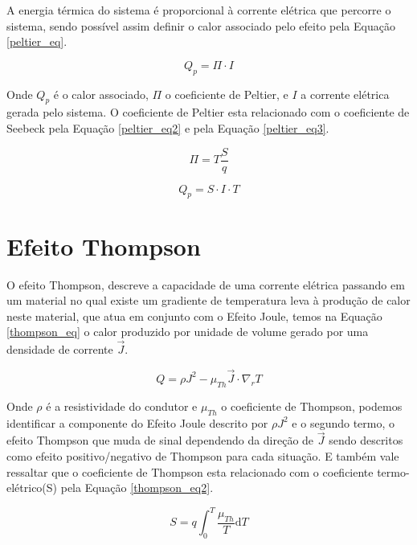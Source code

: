 \documentclass[a4paper,12pt]{report}
\begin{document}
	\noindent A energia térmica do sistema é proporcional à corrente elétrica que percorre o sistema, sendo possível assim definir o calor associado pelo efeito pela Equação \ref{peltier_eq}.
	
	\begin{equation}
	Q_{p} = \Pi \cdot I
	\label{peltier_eq}
	\end{equation}
	
	\noindent Onde $Q_{p}$ é o calor associado, $\Pi$ o coeficiente de Peltier, e $I$ a corrente elétrica gerada pelo sistema. O coeficiente de Peltier esta relacionado com o coeficiente de Seebeck pela Equação \ref{peltier_eq2} e pela Equação \ref{peltier_eq3}.
	
	\begin{equation}
	\Pi = T \frac{S}{q}
	\label{peltier_eq2}
	\end{equation}
	
	\begin{equation}
	Q_{p} = S \cdot I \cdot T
	\label{peltier_eq3}
	\end{equation}
	
	\section{Efeito Thompson}
	
	O efeito Thompson, descreve a capacidade de uma corrente elétrica passando em um material no qual existe um gradiente de temperatura leva à produção de calor neste material, que atua em conjunto com o Efeito Joule, temos na Equação \ref{thompson_eq} o calor produzido por unidade de volume gerado por uma densidade de corrente $\overrightarrow{J}$.
	
	\begin{equation}
	Q = \rho J^{2} - \mu_{Th}\overrightarrow{J}\cdot \nabla_{r}T
	\label{thompson_eq}
	\end{equation}
	
	\noindent Onde $\rho$ é a resistividade do condutor e $\mu_{Th}$ o coeficiente de Thompson, podemos identificar a componente do Efeito Joule descrito por $\rho J^{2}$ e o segundo termo, o efeito Thompson que muda de sinal dependendo da direção de $\overrightarrow{J}$ sendo descritos como efeito positivo/negativo de Thompson para cada situação. E também vale ressaltar que o coeficiente de Thompson esta relacionado com o coeficiente termo-elétrico(S) pela Equação \ref{thompson_eq2}.
	
	\begin{equation}
	S = q \int_{0}^{T} \frac{\mu_{Th}}{T} \mathrm{d}T
	\label{thompson_eq2}
	\end{equation}
	
\end{document}

